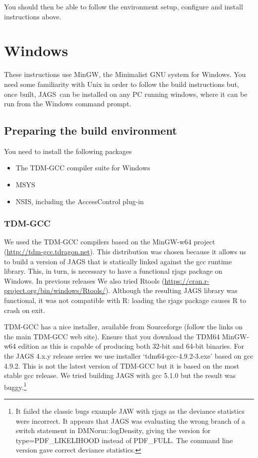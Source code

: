 \documentclass[11pt, a4paper, titlepage]{article}
\newcommand{\JAGS}{\textsf{JAGS}}
\newcommand{\code}[1]{{\bgroup{\normalfont\ttfamily #1}\egroup}}
\newcommand{\file}[1]{{`\normalfont\textsf{#1}'}}
\begin{document}
You should then be able to follow the environment setup, configure and
install instructions above.

\clearpage
\section{Windows}
\label{section:windows}

These instructions use MinGW, the Minimalist GNU system for Windows.
You need some familiarity with Unix in order to follow the build
instructions but, once built, \JAGS\ can be installed on any PC
running windows, where it can be run from the Windows command prompt.

\subsection{Preparing the build environment}

You need to install the following packages
\begin{itemize}
\item The TDM-GCC compiler suite for Windows
\item MSYS  
\item NSIS, including the AccessControl plug-in  
\end{itemize}

\subsubsection{TDM-GCC}

We used the TDM-GCC compilers based on the MinGW-w64 project
(\url{http://tdm-gcc.tdragon.net}).  This distribution was chosen
because it allows us to build a version of JAGS that is statically
linked against the gcc runtime library.  This, in turn, is necessary
to have a functional rjags package on Windows. In previous releases We
also tried Rtools
(\url{https://cran.r-project.org/bin/windows/Rtools/}). Although the
resulting JAGS library was functional, it was not compatible with R:
loading the rjags package causes R to crash on exit.

TDM-GCC has a nice installer, available from Sourceforge (follow the
links on the main TDM-GCC web site). Ensure that you download the
TDM64 MinGW-w64 edition as this is capable of producing both 32-bit
and 64-bit binaries. For the JAGS 4.x.y release series we use
installer \file{tdm64-gcc-4.9.2-3.exe} based on gcc 4.9.2. This is not
the latest version of TDM-GCC but it is based on the most stable gcc
release. We tried building JAGS with gcc 5.1.0 but the result was
buggy.\footnote{It failed the classic bugs example JAW with rjags as
  the deviance statistics were incorrect. It appears that JAGS was
  evaluating the wrong branch of a switch statement in
  \code{DMNorm::logDensity}, giving the version for
  \code{type=PDF\_LIKELIHOOD} instead of \code{PDF\_FULL}. The command line
  version gave correct deviance statistics.}
\end{document}
